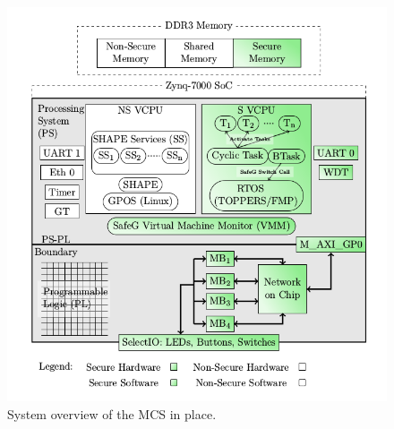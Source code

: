 \begin{figure}[H]
\centering
\includegraphics[width=\textwidth]{./img/introduction_overview.png}
\caption{System overview of the MCS in place.\cite{zaki2016}}\label{fig:introduction_overview}
\end{figure}




